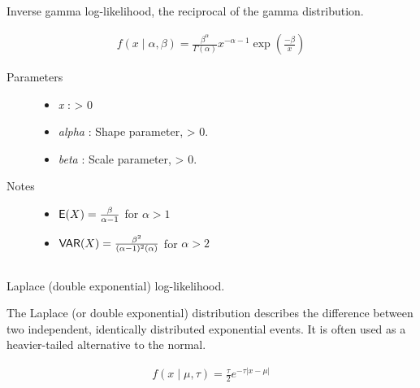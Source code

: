 \documentclass[]{jss}
\begin{document}
\subsection[inverse gamma]{ }

Inverse gamma log-likelihood, the reciprocal of the gamma distribution.

\begin{eqnarray*}
f(x \mid \alpha, \beta) = \frac{\beta^{\alpha}}{\Gamma(\alpha)} x^{-\alpha - 1} \exp\left(\frac{-\beta}{x}\right)    
\end{eqnarray*}

\begin{description}
\item[Parameters] \leavevmode\begin{itemize}
\item {} 
\emph{x} : \textgreater{} 0

\item {} 
\emph{alpha} : Shape parameter, \textgreater{} 0.

\item {} 
\emph{beta} : Scale parameter, \textgreater{} 0.

\end{itemize}

\item[Notes]\leavevmode \begin{itemize} 
\item {}
$\mathsf{E}(X)=\frac{\beta}{\alpha-1}$  for $\alpha > 1$

\item {}
$\mathsf{VAR}(X)=\frac{\beta^2}{(\alpha-1)^2(\alpha)}$  for $\alpha > 2$
\end{itemize} 


\end{description}



\subsection[Laplace]{ }
Laplace (double exponential) log-likelihood.

The Laplace (or double exponential) distribution describes the
difference between two independent, identically distributed exponential
events. It is often used as a heavier-tailed alternative to the normal.

\begin{eqnarray*}
f(x \mid \mu, \tau) = \frac{\tau}{2}e^{-\tau |x-\mu|}    
\end{eqnarray*}
\end{document}
